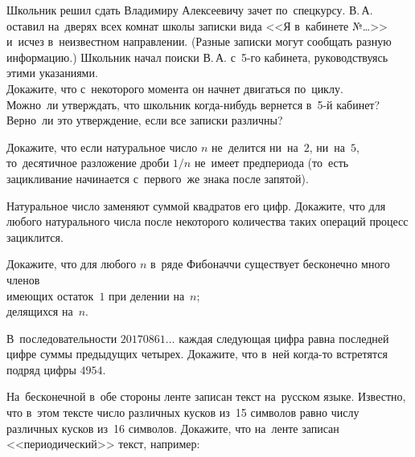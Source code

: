 


\begin{problems}

\item
Школьник решил сдать Владимиру Алексеевичу зачет по~спецкурсу.
В.\,А. оставил на~дверях всех комнат школы записки вида
<<Я в~кабинете №\ldots>> и~исчез в~неизвестном направлении.
(Разные записки могут сообщать разную информацию.)
Школьник начал поиски В.\,А. с~5-го кабинета, руководствуясь этими указаниями.
\\
\subproblem
Докажите, что с~некоторого момента он начнет двигаться по~циклу.
\\
\subproblem
Можно~ли утверждать, что школьник когда-нибудь вернется в~5-й кабинет?
Верно~ли это утверждение, если все записки различны?

\item
Докажите, что если натуральное число $n$ не~делится ни~на~$2$, ни~на~$5$,
то~десятичное разложение дроби $1/n$ не~имеет предпериода
(то~есть зацикливание начинается с~первого~же знака после запятой).

\item
Натуральное число заменяют суммой квадратов его цифр.
Докажите, что для любого натурального числа после некоторого количества таких
операций процесс зациклится.

\item
Докажите, что для любого $n$ в~ряде Фибоначчи существует бесконечно много членов
\\
\subproblem имеющих остаток~$1$ при делении на~$n$;
\\
\subproblem делящихся на~$n$.

\item
В~последовательности $20170861{\ldots}$ каждая следующая цифра равна последней
цифре суммы предыдущих четырех.
Докажите, что в~ней когда-то встретятся подряд цифры $4954$.

\item
На~бесконечной в~обе стороны ленте записан текст на~русском языке.
Известно, что в~этом тексте число различных кусков из~15 символов равно числу
различных кусков из~16 символов.
Докажите, что на~ленте записан <<периодический>> текст, например:
\\


\end{problems}
